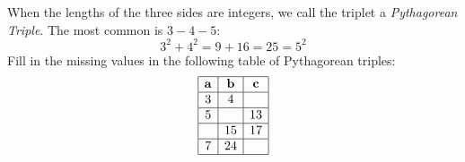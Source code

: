 \documentclass[letterpaper,12pt,fleqn]{article}
\begin{document}
\vspace{2in}

When the lengths of the three sides are integers, we call the triplet a
\emph{Pythagorean Triple}. The most common is $3-4-5$:
\[3^2+4^2=9+16=25=5^2\]
Fill in the missing values in the following table of Pythagorean triples:
\renewcommand{\arraystretch}{2}
\[\begin{array}{|c|c|c|}
\hline
\mathbf{a} & \mathbf{b} & \mathbf{c} \\
\hline
3 & 4 & \\
\hline
5 & & 13 \\
\hline
& 15 & 17 \\
\hline
7 & 24 & \\
\hline
\end{array}\]
\end{document}
